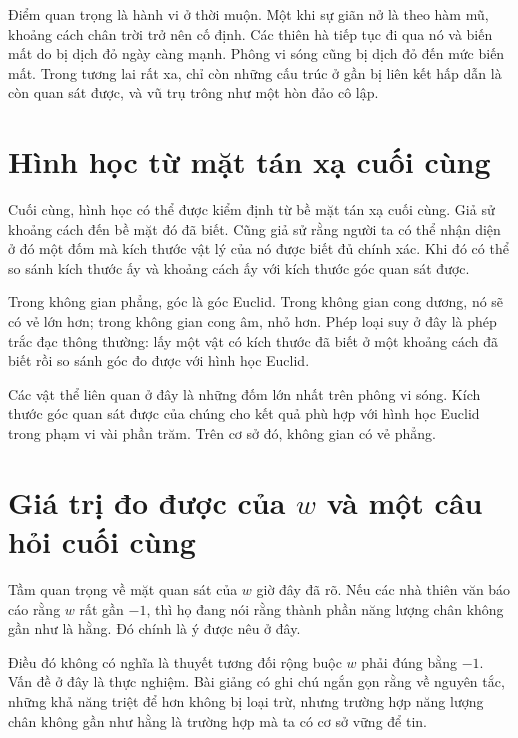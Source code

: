 Điểm quan trọng là hành vi ở thời muộn. Một khi sự giãn nở là theo hàm mũ, khoảng cách chân trời trở nên cố định. Các thiên hà tiếp tục đi qua nó và biến mất do bị dịch đỏ ngày càng mạnh. Phông vi sóng cũng bị dịch đỏ đến mức biến mất. Trong tương lai rất xa, chỉ còn những cấu trúc ở gần bị liên kết hấp dẫn là còn quan sát được, và vũ trụ trông như một hòn đảo cô lập.

\section{Hình học từ mặt tán xạ cuối cùng}

Cuối cùng, hình học có thể được kiểm định từ bề mặt tán xạ cuối cùng. Giả sử khoảng cách đến bề mặt đó đã biết. Cũng giả sử rằng người ta có thể nhận diện ở đó một đốm mà kích thước vật lý của nó được biết đủ chính xác. Khi đó có thể so sánh kích thước ấy và khoảng cách ấy với kích thước góc quan sát được.

Trong không gian phẳng, góc là góc Euclid. Trong không gian cong dương, nó sẽ có vẻ lớn hơn; trong không gian cong âm, nhỏ hơn. Phép loại suy ở đây là phép trắc đạc thông thường: lấy một vật có kích thước đã biết ở một khoảng cách đã biết rồi so sánh góc đo được với hình học Euclid.

\begin{classroomqa}
\end{classroomqa}

Các vật thể liên quan ở đây là những đốm lớn nhất trên phông vi sóng. Kích thước góc quan sát được của chúng cho kết quả phù hợp với hình học Euclid trong phạm vi vài phần trăm. Trên cơ sở đó, không gian có vẻ phẳng.

\section{Giá trị đo được của \(w\) và một câu hỏi cuối cùng}

Tầm quan trọng về mặt quan sát của \(w\) giờ đây đã rõ. Nếu các nhà thiên văn báo cáo rằng \(w\) rất gần \(-1\), thì họ đang nói rằng thành phần năng lượng chân không gần như là hằng. Đó chính là ý được nêu ở đây.

Điều đó không có nghĩa là thuyết tương đối rộng buộc \(w\) phải đúng bằng \(-1\). Vấn đề ở đây là thực nghiệm. Bài giảng có ghi chú ngắn gọn rằng về nguyên tắc, những khả năng triệt để hơn không bị loại trừ, nhưng trường hợp năng lượng chân không gần như hằng là trường hợp mà ta có cơ sở vững để tin.

